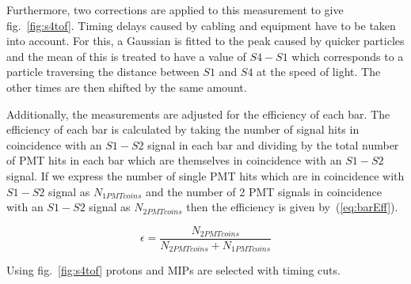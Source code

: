 	Furthermore, two corrections are applied to this measurement to give fig.~\ref{fig:s4tof}. Timing delays caused by cabling and equipment have to be taken into account. For this, a Gaussian is fitted to the peak caused by quicker particles and the mean of this is treated to have a value of $S4 - S1$ which corresponds to a particle traversing the distance between $S1$ and $S4$ at the speed of light. The other times are then shifted by the same amount.
	
	Additionally, the measurements are adjusted for the efficiency of each bar. The efficiency of each bar is calculated by taking the number of signal hits in coincidence with an $S1-S2$ signal in each bar and dividing by the total number of PMT hits in each bar which are themselves in coincidence with an $S1-S2$ signal. If we express the number of single PMT hits which are in coincidence with $S1-S2$ signal as $N_{1PMTcoins}$ and the number of 2 PMT signals in coincidence with an $S1-S2$ signal as $N_{2PMTcoins}$ then the efficiency is given by~(\ref{eq:barEff}).
	
	\begin{equation}
		\epsilon = \frac{N_{2PMTcoins}}{N_{2PMTcoins}+N_{1PMTcoins}}
		\label{eq:barEff}
	\end{equation}
	
	Using fig.~\ref{fig:s4tof} protons and MIPs are selected with timing cuts.